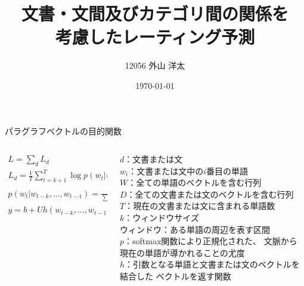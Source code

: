\documentclass[unicode,10pt]{beamer}
\title{文書・文間及びカテゴリ間の関係を\\考慮したレーティング予測}
\institute{知能数理研究室}
\author{12056 外山 洋太}
\date{\today}
\newlength{\mycolumnwidth}
\begin{document}
\Large %

\begin{frame}{パラグラフベクトルの目的関数}{}
  \begin{columns}
    \begin{column}{\mycolumnwidth}
      \begin{gather*}
        L = \sum_d L_d \\
        L_d = \frac{1}{T} \sum^{T}_{t = k + 1}
              \log p(w_t | w_{t-k}, ..., w_{t-1}), \\
        p(w_t | w_{t-k}, ..., w_{t-1})
            = \frac{e^{y_{w_t}}}{\sum_{w'} e^{y_{w'}}}, \\
        y = b + Uh(w_{t-k}, ..., w_{t-1}, d; W, D)
      \end{gather*}
    \end{column}
    \begin{column}{\mycolumnwidth}
      $d$：文書または文 \\
      $w_i$：文書または文中の$i$番目の単語 \\
      $W$：全ての単語のベクトルを含む行列 \\
      $D$：全ての文書または文のベクトルを含む行列 \\
      $T$：現在の文書または文に含まれる単語数 \\
      $k$：ウィンドウサイズ \\
      ウィンドウ：ある単語の周辺を表す区間 \\
      $p$：softmax関数により正規化された、
           文脈から現在の単語が導かれることの尤度 \\
      $h$：引数となる単語と文書または文のベクトルを結合した
           ベクトルを返す関数 \\
    \end{column}
  \end{columns}
\end{frame}
\end{document}
